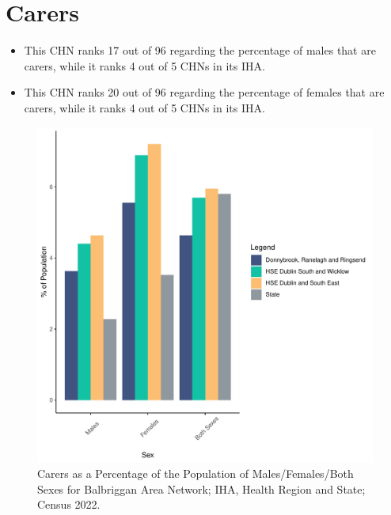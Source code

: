 \documentclass{article}
\begin{document}
\section{Carers}\label{sect:Carers}
\begin{itemize}
\item This CHN ranks  17 out of 96 regarding the percentage of males that are carers, while it ranks   4 out of 5 CHNs in its IHA.
\item This CHN ranks  20 out of 96 regarding the percentage of females that are carers, while it ranks   4 out of 5 CHNs in its IHA.
\end{itemize}
\begin{figure}[H]
	\centering
	\includegraphics[width = 150mm]{../figures/CareED.pdf}
	\caption{Carers as a Percentage of the Population of Males/Females/Both Sexes for Balbriggan Area Network; IHA, Health Region and State; Census 2022.}
	\label{fig:2ae19629-1a6a-13a3-e055-000000000001}
	\end{figure}
\end{document}
